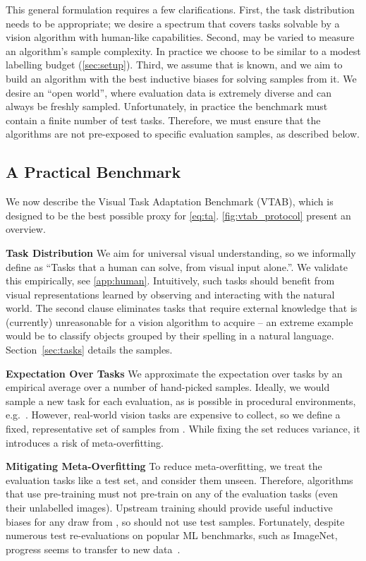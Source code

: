 \documentclass{article}
\newcommand{\myparagraph}[1]{\noindent\textbf{#1}\quad}
\newcommand{\imagenet}{ImageNet}
\begin{document}
This general formulation requires a few clarifications.
First, the task distribution needs to be appropriate; we desire a spectrum that covers tasks solvable by a vision algorithm with human-like capabilities.
Second,  may be varied to measure an algorithm's sample complexity.
In practice we choose  to be similar to a modest labelling budget (\cref{sec:setup}).
Third, we assume that  is known, and we aim to build an algorithm with the best inductive biases for solving samples from it.
We desire an ``open world'', where evaluation data is extremely diverse and can always be freshly sampled.
Unfortunately, in practice the benchmark must contain a finite number of test tasks. Therefore, we must ensure that the algorithms are not pre-exposed to specific evaluation samples, as described below.


\subsection{A Practical Benchmark}
We now describe the Visual Task Adaptation Benchmark (VTAB), which is designed to be the best possible proxy for \cref{eq:ta}.
\cref{fig:vtab_protocol} present an overview.

\myparagraph{Task Distribution}
We aim for universal visual understanding, so we informally define  as ``Tasks that a human can solve, from visual input alone.''. 
We validate this empirically, see \cref{app:human}.
Intuitively, such tasks should benefit from visual representations learned by observing and interacting with the natural world. 
The second clause eliminates tasks that require external knowledge that is (currently) unreasonable for a vision algorithm to acquire -- an extreme example would be to classify objects grouped by their spelling in a natural language.
Section~\ref{sec:tasks} details the samples.

\myparagraph{Expectation Over Tasks}
We approximate the expectation over tasks by an empirical average over a number of hand-picked samples.
Ideally, we would sample a new task for each evaluation, as is possible in procedural environments, e.g.~\citep{finn2017}.
However, real-world vision tasks are expensive to collect, so we define a fixed, representative set of samples from .
While fixing the set reduces variance, it introduces a risk of meta-overfitting.

\myparagraph{Mitigating Meta-Overfitting}
To reduce meta-overfitting, we treat the evaluation tasks like a test set, and consider them unseen.
Therefore, algorithms that use pre-training must not pre-train on any of the evaluation tasks (even their unlabelled images).
Upstream training should provide useful inductive biases for any draw from , so should not use test samples. 
Fortunately, despite numerous test re-evaluations on popular ML benchmarks, such as \imagenet{}, progress seems to transfer to new data~\citep{recht18cifar,recht19imagenet,kornblith2018better}.
\end{document}
